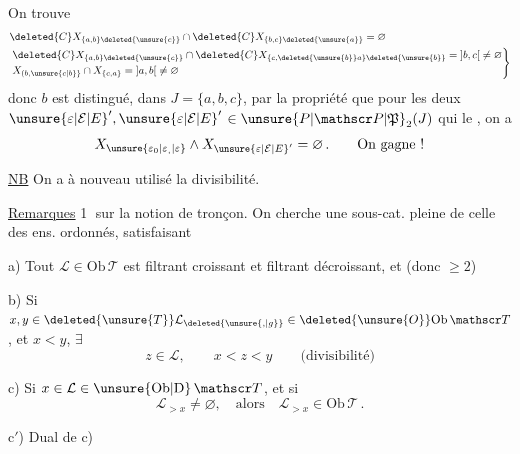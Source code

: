 On trouve
\[
\begin{aligned}
&\deleted{C}X_{\{a,b\}\deleted{\unsure{c}}}\cap\deleted{C}X_{\{b,c\}\deleted{\unsure{a}}}=\varnothing\\
&\left.\begin{aligned}
&\deleted{C}X_{\{a,b\}\deleted{\unsure{c}}}\cap\deleted{C}X_{\{c,\deleted{\unsure{b}}a\}\deleted{\unsure{b}}}=\mathopen{]}b,c\mathclose{[}\ne\varnothing\\
&X_{(b,\unsure{c|b}\}}\cap X_{\{c,a\}}=\mathopen{]}a,b\mathclose{[}\ne\varnothing
\end{aligned}\right\}
\end{aligned}
\]
donc $b$ est distingué, dans $J=\{a,b,c\}$, par la propriété que pour les deux  ${\unsure{\varepsilon|\mathcal E|E}}',\unsure{\varepsilon|\mathcal E|E}'$  $\in\unsure{P|\mathscr P|\mathfrak P}_2(J)$ qui le , on a
\[
 X_{\unsure{\varepsilon_{0}|\varepsilon_{,}|\varepsilon}}\wedge X_{\unsure{\varepsilon|\mathcal E|E}'}=\varnothing\,.\qquad\text{On gagne !}
\]

\uline{NB} On a à nouveau utilisé la divisibilité.

\uline{Remarques} \textcircled{1}  sur la notion de tronçon. On cherche une sous-cat. pleine  de celle des ens. ordonnés, satisfaisant

a) Tout $\mathcal L\in\mathrm{Ob}\,\mathscr T$ est filtrant croissant et filtrant décroissant, et   (donc $\geq2$)

b) Si $x,y\in\deleted{\unsure{T}}\mathcal L_{\deleted{\unsure{,|g}}}\in\deleted{\unsure{O}}\mathrm{Ob}\,\mathscr T$, et $x<y$, $\exists$
\[
 z\in\mathcal L,\qquad x<z<y\qquad\text{(divisibilité)}
\]

c) Si $x\in\mathcal L\in\unsure{\mathrm{Ob}|\mathrm D}\,\mathscr T$,  et si
\[
 \mathcal L_{>x}\ne\varnothing,\quad\text{alors}\quad \mathcal L_{>x}\in\mathrm{Ob}\,\mathscr T\,.
\]

c$'$) Dual de c)

